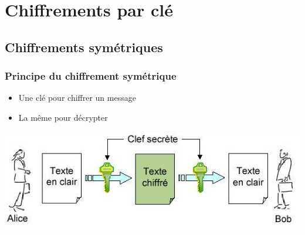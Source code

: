 \documentclass[xcolor={dvipsnames}]{beamer}
\begin{document}
\section{Chiffrements par clé}

\subsection{Chiffrements symétriques}

\begin{frame}
\frametitle{Principe du chiffrement symétrique}

\begin{itemize}
	\item Une clé pour chiffrer un message
	\item La même pour décrypter
\end{itemize}

\begin{center}
	\includegraphics[scale=0.5]{sym}
\end{center}
\end{frame}
\end{document}
